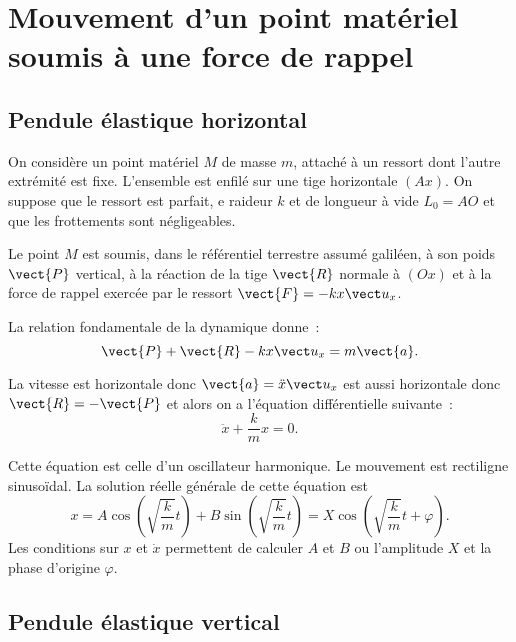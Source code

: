 \section{Mouvement d'un point matériel soumis à une force de rappel}
\label{chap3-sec:mouvementdunpointmaterielsoumisauneforcederappel}


\subsection{Pendule élastique horizontal}
\label{chap3-subsec:pendulehorizontal}

On considère un point matériel $M$ de masse $m$, attaché à un ressort dont l'autre extrémité est fixe. L'ensemble est enfilé sur une tige horizontale $(Ax)$. On suppose que le ressort est parfait, e raideur $k$ et de longueur à vide $L_0=AO$ et que les frottements sont négligeables.

Le point $M$ est soumis, dans le référentiel terrestre assumé galiléen, à son poids $\vect{P}$ vertical, à la réaction de la tige $\vect{R}$ normale à $(Ox)$ et à la force de rappel exercée par le ressort $\vect{F}=-kx\ux$.

La relation fondamentale de la dynamique donne~:
\begin{equation}
  \vect{P}+\vect{R}-kx\ux = m\vect{a}.
\end{equation}

La vitesse est horizontale donc $\vect{a} = \ddot{x}\ux$ est aussi horizontale donc $\vect{R}=-\vect{P}$ et alors on a l'équation différentielle suivante~:
\begin{equation}
  \ddot{x} +\frac{k}{m}x=0.
\end{equation}

Cette équation est celle d'un oscillateur harmonique. Le mouvement est rectiligne sinusoïdal. La solution réelle générale de cette équation est
\begin{equation}
  x = A \cos\left(\sqrt{\frac{k}{m}} t\right) + B \sin\left(\sqrt{\frac{k}{m}} t\right) = X \cos\left(\sqrt{\frac{k}{m}} t + \varphi\right).
\end{equation}
Les conditions sur $x$ et $\dot{x}$ permettent de calculer $A$ et $B$ ou l'amplitude $X$ et la phase d'origine $\varphi$.

\subsection{Pendule élastique vertical}
\label{chap3-subsec:pendulevertical}

